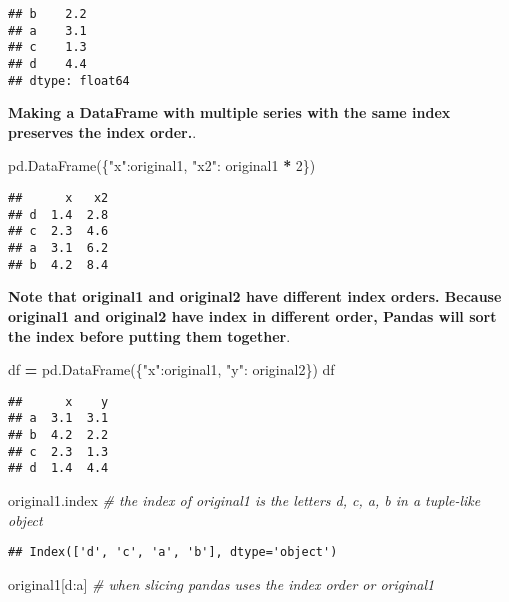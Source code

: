\documentclass[
]{book}
\newenvironment{Shaded}{\begin{snugshade}}{\end{snugshade}}
\newcommand{\CommentTok}[1]{\textcolor[rgb]{0.56,0.35,0.01}{\textit{#1}}}
\newcommand{\DecValTok}[1]{\textcolor[rgb]{0.00,0.00,0.81}{#1}}
\newcommand{\NormalTok}[1]{#1}
\newcommand{\OperatorTok}[1]{\textcolor[rgb]{0.81,0.36,0.00}{\textbf{#1}}}
\newcommand{\StringTok}[1]{\textcolor[rgb]{0.31,0.60,0.02}{#1}}
\begin{document}
\begin{verbatim}
## b    2.2
## a    3.1
## c    1.3
## d    4.4
## dtype: float64
\end{verbatim}

{\textbf{Making a DataFrame with multiple series with the same index preserves the index order.}}.

\begin{Shaded}
\begin{Highlighting}[]
\NormalTok{pd.DataFrame(\{}\StringTok{"x"}\NormalTok{:original1, }\StringTok{"x2"}\NormalTok{: original1 }\OperatorTok{*} \DecValTok{2}\NormalTok{\})}
\end{Highlighting}
\end{Shaded}

\begin{verbatim}
##      x   x2
## d  1.4  2.8
## c  2.3  4.6
## a  3.1  6.2
## b  4.2  8.4
\end{verbatim}

{\textbf{Note that original1 and original2 have different index orders. Because original1 and original2 have index in different order, Pandas will sort the index before putting them together}}.

\begin{Shaded}
\begin{Highlighting}[]
\NormalTok{df }\OperatorTok{=}\NormalTok{ pd.DataFrame(\{}\StringTok{"x"}\NormalTok{:original1, }\StringTok{"y"}\NormalTok{: original2\})}
\NormalTok{df}
\end{Highlighting}
\end{Shaded}

\begin{verbatim}
##      x    y
## a  3.1  3.1
## b  4.2  2.2
## c  2.3  1.3
## d  1.4  4.4
\end{verbatim}

\begin{Shaded}
\begin{Highlighting}[]
\NormalTok{original1.index }\CommentTok{\# the index of original1 is the letters d, c, a, b in a tuple{-}like object}
\end{Highlighting}
\end{Shaded}

\begin{verbatim}
## Index(['d', 'c', 'a', 'b'], dtype='object')
\end{verbatim}

\begin{Shaded}
\begin{Highlighting}[]
\NormalTok{original1[}\StringTok{\textquotesingle{}d\textquotesingle{}}\NormalTok{:}\StringTok{\textquotesingle{}a\textquotesingle{}}\NormalTok{] }\CommentTok{\# when slicing pandas uses the index order or original1}
\end{Highlighting}
\end{Shaded}
\end{document}
